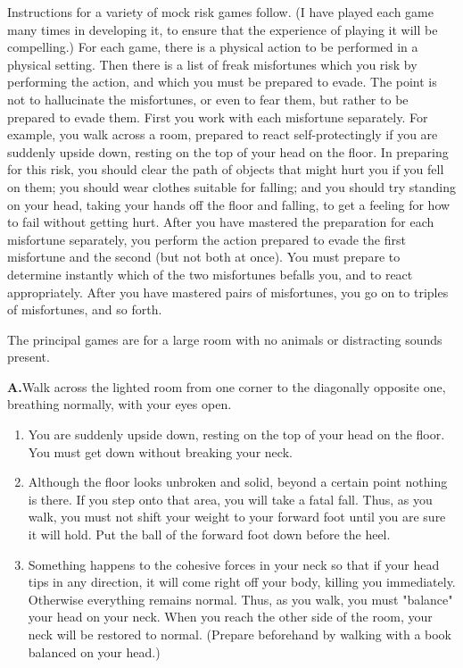 \documentclass[10pt,twoside,draft]{memoir}
\begin{document}
{{Instructions for a variety of mock risk games follow. (I have played 
each game many times in developing it, to ensure that the experience of 
playing it will be compelling.) For each game, there is a physical action to be 
performed in a physical setting. Then there is a list of freak misfortunes 
which you risk by performing the action, and which you must be prepared 
to evade. The point is not to hallucinate the misfortunes, or even to fear 
them, but rather to be prepared to evade them. First you work with each 
misfortune separately. For example, you walk across a room, prepared to 
react self-protectingly if you are suddenly upside down, resting on the top of 
your head on the floor. In preparing for this risk, you should clear the path 
of objects that might hurt you if you fell on them; you should wear clothes 
suitable for falling; and you should try standing on your head, taking your 
hands off the floor and falling, to get a feeling for how to fail without 
getting hurt. After you have mastered the preparation for each misfortune 
separately, you perform the action prepared to evade the first misfortune 
and the second (but not both at once). You must prepare to determine 
instantly which of the two misfortunes befalls you, and to react 
appropriately. After you have mastered pairs of misfortunes, you go on to 
triples of misfortunes, and so forth. 

The principal games are for a large room with no animals or distracting 
sounds present. 

\textbf{A.}Walk across the lighted room from one corner to the diagonally 
opposite one, breathing normally, with your eyes open. 
\begin{enumerate}
\item You are suddenly upside down, resting on the top of your head on the 
floor. You must get down without breaking your neck. 

\item Although the floor looks unbroken and solid, beyond a certain point 
nothing is there. If you step onto that area, you will take a fatal fall. Thus, as 
you walk, you must not shift your weight to your forward foot until you are 
sure it will hold. Put the ball of the forward foot down before the heel. 

\item Something happens to the cohesive forces in your neck so that if your 
head tips in any direction, it will come right off your body, killing you 
immediately. Otherwise everything remains normal. Thus, as you walk, you 
must "balance" your head on your neck. When you reach the other side of 
the room, your neck will be restored to normal. (Prepare beforehand by 
walking with a book balanced on your head.) 


\end{enumerate}}}
\end{document}
